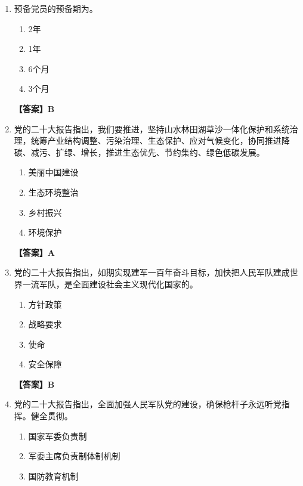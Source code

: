 \documentclass[UTF8,11pt,a4paper]{ctexart}
\begin{document}
\begin{enumerate}[label=\textbf{\arabic*.}, leftmargin=2.5em, itemsep=0.7em]
\begin{enumerate}[label=\Alph*., leftmargin=2em, itemsep=0.1em, topsep=0.15em]
\item 中央有关部委和国家机关部门党组（党委）每年一定会开展巡视工作
\end{enumerate}
\textbf{【答案】B}
\item 预备党员的预备期为\allowbreak\underline{\hspace{4em}}。
\begin{enumerate}[label=\Alph*., leftmargin=2em, itemsep=0.1em, topsep=0.15em]
\item 2年
\item 1年
\item 6个月
\item 3个月
\end{enumerate}
\textbf{【答案】B}
\item 党的二十大报告指出，我们要推进\allowbreak\underline{\hspace{4em}}，坚持山水林田湖草沙一体化保护和系统治理，统筹产业结构调整、污染治理、生态保护、应对气候变化，协同推进降碳、减污、扩绿、增长，推进生态优先、节约集约、绿色低碳发展。
\begin{enumerate}[label=\Alph*., leftmargin=2em, itemsep=0.1em, topsep=0.15em]
\item 美丽中国建设
\item 生态环境整治
\item 乡村振兴
\item 环境保护
\end{enumerate}
\textbf{【答案】A}
\item 党的二十大报告指出，如期实现建军一百年奋斗目标，加快把人民军队建成世界一流军队，是全面建设社会主义现代化国家的\allowbreak\underline{\hspace{4em}}。
\begin{enumerate}[label=\Alph*., leftmargin=2em, itemsep=0.1em, topsep=0.15em]
\item 方针政策
\item 战略要求
\item 使命
\item 安全保障
\end{enumerate}
\textbf{【答案】B}
\item 党的二十大报告指出，全面加强人民军队党的建设，确保枪杆子永远听党指挥。健全贯彻\allowbreak\underline{\hspace{4em}}。
\begin{enumerate}[label=\Alph*., leftmargin=2em, itemsep=0.1em, topsep=0.15em]
\item 国家军委负责制
\item 军委主席负责制体制机制
\item 国防教育机制

\end{enumerate}
\end{enumerate}
\end{document}
